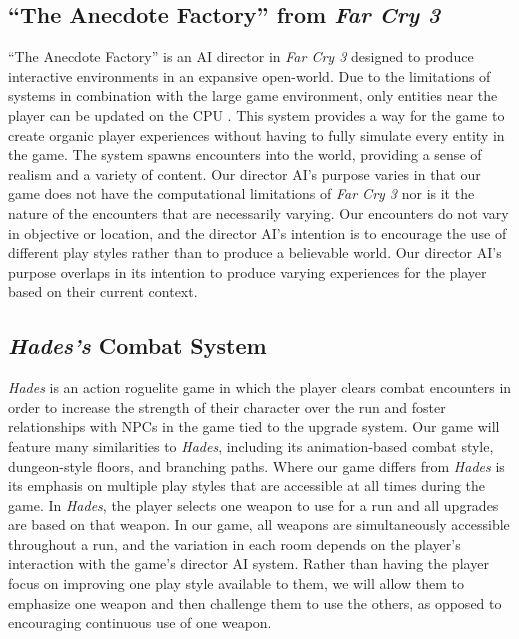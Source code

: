 \documentclass[12pt]{article}
\begin{document}
\subsection{``The Anecdote Factory'' from \textit{Far Cry 3}}
``The Anecdote Factory'' is an AI director in \textit{Far Cry 3} designed to produce interactive environments in an expansive open-world. Due to the limitations of systems in combination with the large game environment, only entities near the player can be updated on the CPU \cite{thompson_fc3}. This system provides a way for the game to create organic player experiences without having to fully simulate every entity in the game. The system spawns encounters into the world, providing a sense of realism and a variety of content. Our director AI's purpose varies in that our game does not have the computational limitations of \textit{Far Cry 3} nor is it the nature of the encounters that are necessarily varying. Our encounters do not vary in objective or location, and the director AI's intention is to encourage the use of different play styles rather than to produce a believable world. Our director AI's purpose overlaps in its intention to produce varying experiences for the player based on their current context.
\subsection{\textit{Hades’s} Combat System}
\textit{Hades} is an action roguelite game in which the player clears combat encounters in order to increase the strength of their character over the run and foster relationships with NPCs in the game tied to the upgrade system. Our game will feature many similarities to \textit{Hades}, including its animation-based combat style, dungeon-style floors, and branching paths. Where our game differs from \textit{Hades} is its emphasis on multiple play styles that are accessible at all times during the game. In \textit{Hades}, the player selects one weapon to use for a run and all upgrades are based on that weapon. In our game, all weapons are simultaneously accessible throughout a run, and the variation in each room depends on the player's interaction with the game's director AI system. Rather than having the player focus on improving one play style available to them, we will allow them to emphasize one weapon and then challenge them to use the others, as opposed to encouraging continuous use of one weapon.



\newpage


\end{document}
